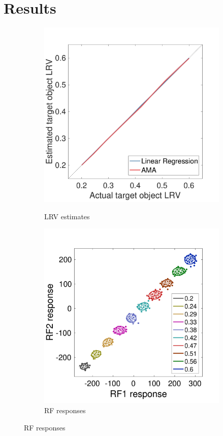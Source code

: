 \documentclass{jov}
\begin{document}
\section{Results} \label{Results}
\begin{figure}
\centering
            \begin{subfigure}[b]{0.3 \textwidth}
        \caption{LRV estimates}
        \includegraphics[width=\textwidth, trim={0 0 0 1.3cm},clip]{../FiguresDraft5/Figure10/Figure10_a.pdf}
        \label{fig:case1Estimates}
    \end{subfigure} 
        \begin{subfigure}[b]{0.31 \textwidth}
        \caption{RF responses}
        \includegraphics[width=\textwidth, trim={0 3mm 0 15mm},clip]{../FiguresDraft5/Figure10/Figure10_b.pdf}

\end{subfigure}
\end{figure}
\end{document}
